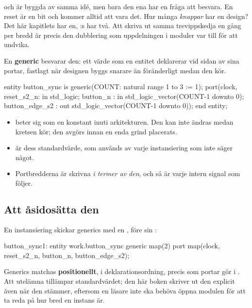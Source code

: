  och  är byggda av samma idé, men bara den ena har en fråga att
besvara. En reset är en bit och kommer alltid att vara det. Hur många \emph{knappar} har en design?
Det här kapitlets  har en, :s  har två. Att
skriva ut samma trevippskedja en gång per bredd är precis den dubblering som uppdelningen i moduler
var till för att undvika.

En \textbf{generic} besvarar den: ett värde som en entitet deklarerar vid sidan av sina portar,
fastlagt när designen byggs snarare än föränderligt medan den kör.

\begin{vhdlcode}
entity button_sync is
    generic(COUNT: natural range 1 to 3 := 1);
    port(clock, reset_s2_n: in  std_logic;
         button_n         : in  std_logic_vector(COUNT-1 downto 0);
         button_edge_s2   : out std_logic_vector(COUNT-1 downto 0));
end entity;
\end{vhdlcode}

\begin{itemize}
  \item {} beter sig som en konstant inuti arkitekturen. Den kan inte ändras medan
    kretsen kör; den avgörs innan en enda grind placerats.
  \item {} är dess standardvärde, som används av varje instansiering som inte säger något.
  \item Portbredderna är skrivna \emph{i termer av den}, och så är varje intern signal som följer.
\end{itemize}

\subsection*{Att åsidosätta den}
En instansiering skickar generics med en , före sin :

\begin{vhdlcode}
button_sync1: entity work.button_sync
    generic map(2)
    port map(clock, reset_s2_n, button_n, button_edge_s2);
\end{vhdlcode}

Generics matchas \textbf{positionellt}, i deklarationsordning, precis som portar gör i
. Att utelämna  tillämpar standardvärdet; den här boken
skriver ut den explicit även när den stämmer, eftersom en läsare inte ska behöva öppna modulen för
att ta reda på hur bred en instans är.

